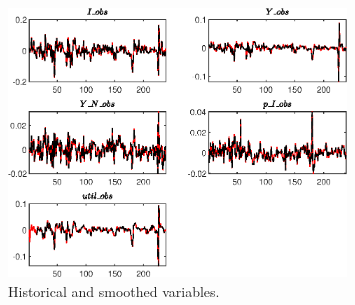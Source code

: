  
\begin{figure}[H]
\centering 
\includegraphics[width=0.80\textwidth]{BRS_pred_labor/graphs/BRS_pred_labor_HistoricalAndSmoothedVariables1}
\caption{Historical and smoothed variables.}\label{Fig:HistoricalAndSmoothedVariables:1}
\end{figure}


